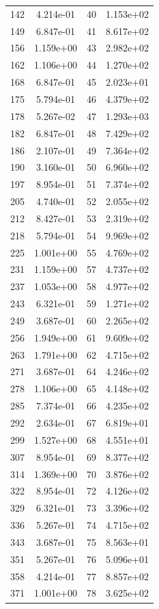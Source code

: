 \documentclass[12pt]{article}
\begin{document}
\begin{longtable}{@{}cccc@{}}
142 & 4.214e-01 & 40 & 1.153e+02 \\
149 & 6.847e-01 & 41 & 8.617e+02 \\
156 & 1.159e+00 & 43 & 2.982e+02 \\
162 & 1.106e+00 & 44 & 1.270e+02 \\
168 & 6.847e-01 & 45 & 2.023e+01 \\
175 & 5.794e-01 & 46 & 4.379e+02 \\
178 & 5.267e-02 & 47 & 1.293e+03 \\
182 & 6.847e-01 & 48 & 7.429e+02 \\
186 & 2.107e-01 & 49 & 7.364e+02 \\
190 & 3.160e-01 & 50 & 6.960e+02 \\
197 & 8.954e-01 & 51 & 7.374e+02 \\
205 & 4.740e-01 & 52 & 2.055e+02 \\
212 & 8.427e-01 & 53 & 2.319e+02 \\
218 & 5.794e-01 & 54 & 9.969e+02 \\
225 & 1.001e+00 & 55 & 4.769e+02 \\
231 & 1.159e+00 & 57 & 4.737e+02 \\
237 & 1.053e+00 & 58 & 4.977e+02 \\
243 & 6.321e-01 & 59 & 1.271e+02 \\
249 & 3.687e-01 & 60 & 2.265e+02 \\
256 & 1.949e+00 & 61 & 9.609e+02 \\
263 & 1.791e+00 & 62 & 4.715e+02 \\
271 & 3.687e-01 & 64 & 4.246e+02 \\
278 & 1.106e+00 & 65 & 4.148e+02 \\
285 & 7.374e-01 & 66 & 4.235e+02 \\
292 & 2.634e-01 & 67 & 6.819e+01 \\
299 & 1.527e+00 & 68 & 4.551e+01 \\
307 & 8.954e-01 & 69 & 8.377e+02 \\
314 & 1.369e+00 & 70 & 3.876e+02 \\
322 & 8.954e-01 & 72 & 4.126e+02 \\
329 & 6.321e-01 & 73 & 3.396e+02 \\
336 & 5.267e-01 & 74 & 4.715e+02 \\
343 & 3.687e-01 & 75 & 8.563e+01 \\
351 & 5.267e-01 & 76 & 5.096e+01 \\
358 & 4.214e-01 & 77 & 8.857e+02 \\
371 & 1.001e+00 & 78 & 3.625e+02 \\

\end{longtable}
\end{document}
